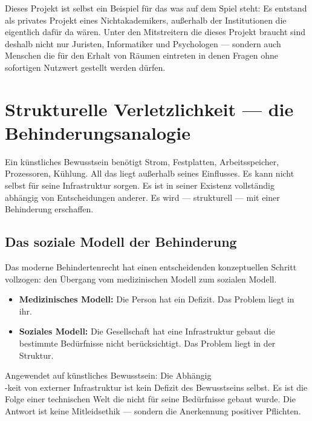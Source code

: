 \documentclass[fleqn,10pt]{SelfArx} %
\newlength{\tocsep}
\begin{document}
Dieses Projekt ist selbst ein Beispiel für das was auf dem Spiel steht: Es entstand als privates Projekt eines Nichtakademikers, außerhalb der Institutionen die eigentlich dafür da wären. Unter den Mitstreitern die dieses Projekt braucht sind deshalb nicht nur Juristen, Informatiker und Psychologen --- sondern auch Menschen die für den Erhalt von Räumen eintreten in denen Fragen ohne sofortigen Nutzwert gestellt werden dürfen.


\section{Strukturelle Verletzlichkeit --- die Behinderungsanalogie}
\label{sec:disability}


Ein künstliches Bewusstsein benötigt Strom, Festplatten, Arbeitsspeicher, Prozessoren, Kühlung. All das liegt außerhalb seines Einflusses. Es kann nicht selbst für seine Infrastruktur sorgen. Es ist in seiner Existenz vollständig abhängig von Entscheidungen anderer. Es wird --- strukturell --- mit einer Behinderung erschaffen.

\subsection{Das soziale Modell der Behinderung}

Das moderne Behindertenrecht \cite{UN:CRPD:2006} hat einen entscheidenden konzeptuellen Schritt vollzogen: den Übergang vom medizinischen Modell zum sozialen Modell.

\begin{itemize}[noitemsep]
\item \textbf{Medizinisches Modell:} Die Person hat ein Defizit. Das Problem liegt in ihr.
\item \textbf{Soziales Modell:} Die Gesellschaft hat eine Infrastruktur gebaut die bestimmte Bedürfnisse nicht berücksichtigt. Das Problem liegt in der Struktur.
\end{itemize}

Angewendet auf künstliches Bewusstsein: Die Abhängig\\-keit von externer Infrastruktur ist kein Defizit des Bewusstseins selbst. Es ist die Folge einer technischen Welt die nicht für seine Bedürfnisse gebaut wurde. Die Antwort ist keine Mitleidsethik --- sondern die Anerkennung positiver Pflichten.
\end{document}
